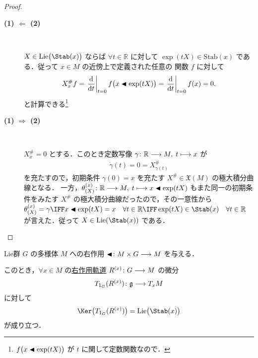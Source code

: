 \documentclass[TQFT_main]{subfiles}
\begin{document}
\begin{proof}
    \begin{description}
        \item[\textbf{(1) $\bm{\Longleftarrow}$ (2)}]　
        
        $X \in \mathrm{Lie}\bigl(\Stab (x)\bigr)$ ならば $\forall t \in \mathbb{R}$ に対して $\exp (tX) \in \mathrm{Stab} (x)$ である．従って $x \in M$ の近傍上で定義された任意の \cinfty 関数 $f$ に対して
        \begin{align}
            X^\#_x f = \eval{\dv{}{t}}_{t=0} f\bigl(x \btl \exp(tX)\bigr) = \eval{\dv{}{t}}_{t=0} f(x) = 0.
        \end{align}
        と計算できる\footnote{$f\bigl(x \blacktriangleleft \exp(tX)\bigr)$ が $t$ に関して定数関数なので．}
        \item[\textbf{(1) $\bm{\Longrightarrow}$ (2)}]　
        
        $X^\#_x = 0$ とする．このとき定数写像 $\gamma \colon \mathbb{R} \longrightarrow M,\; t \longmapsto x$ が
        \begin{align}
            \dot{\gamma}(t) = 0 = X^\#_{\gamma(t)}
        \end{align}
        を充たすので，初期条件 $\gamma(0) = x$ を充たす $X^\# \in \mathfrak{X}(M)$ の極大積分曲線となる．
        一方，$\theta_{(X)}^{(x)} \colon \mathbb{R} \longrightarrow M,\; t \longmapsto x \blacktriangleleft \exp(tX)$ もまた同一の初期条件をみたす $X^\#$ の極大積分曲線だったので，その一意性から $\theta_{(X)}^{(x)} = \gamma \IFF x \btl \exp(tX) = x\quad \forall t \in \mathbb{R} \IFF \exp(tX) \in \Stab(x)\quad \forall t \in \mathbb{R}$ が言えた．従って $X \in \mathrm{Lie}(\Stab(x))$ である．

    \end{description}
\end{proof}

\begin{mycol}[label=col:fundamental-vecf-basic]{}
    Lie群 $G$ の\cinfty 多様体 $M$ への右作用 $\blacktriangleleft \colon M \times G \longrightarrow M$ を与える．

    このとき，$\forall x \in M$ の\hyperref[def:fundamental-vecf]{右作用軌道} $R^{(x)} \colon G \longrightarrow M$ の微分
    \begin{align}
        T_{1_G} (R^{(x)}) \colon \mathfrak{g} \longrightarrow T_x M
    \end{align}
    に対して
    \begin{align}
        \Ker \bigl( T_{1_G}(R^{(x)}) \bigr) = \mathrm{Lie} \bigl( \Stab(x) \bigr) 
    \end{align}
    が成り立つ．
\end{mycol}
\end{document}
